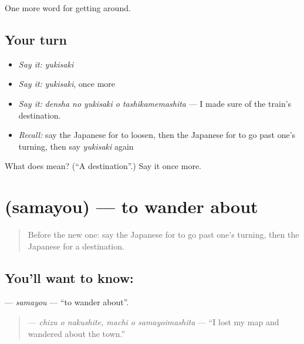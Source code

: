 \begin{grammarlens}[title={What you've built}]
One more word for getting around.
\end{grammarlens}

\subsection*{Your turn}
\begin{itemize}
\raggedright
  \item \emph{Say it:} \emph{yukisaki}
  \item \emph{Say it:} \emph{yukisaki}, once more
  \item \emph{Say it:} \emph{densha no yukisaki o tashikamemashita} — I made sure of the train's destination.
  \item \emph{Recall:} say the Japanese for to loosen, then the Japanese for to go past one's turning, then say \emph{yukisaki} again
\end{itemize}

\begin{tcolorbox}[breakable,colback=teal!4,colframe=teal!35!black,title={Before you move on}]
What does  mean? (\textquotedblleft{}A destination\textquotedblright{}.) Say it once more.
\end{tcolorbox}
\section[\texorpdfstring{\ja{さまよう} (samayou)}{さまよう (samayou)}]{ (samayou) — to wander about}

\label{lesson:JA-C396-samayou}



\begin{quote}
Before the new one: say the Japanese for to go past one's turning, then the Japanese for a destination.
\end{quote}

\subsection*{You'll want to know: }
\textbf{} — \emph{samayou} — \textquotedblleft{}to wander about\textquotedblright{}.

\begin{quote}
\textbf{  } — \emph{chizu o nakushite, machi o samayoimashita} — \textquotedblleft{}I lost my map and wandered about the town.\textquotedblright{}
\end{quote}

